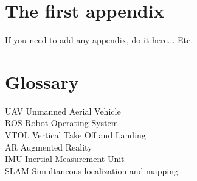 \chapter{The first appendix}
If you need to add any appendix, do it here...
 Etc.
\chapter{Glossary}
UAV Unmanned Aerial Vehicle\\
ROS Robot Operating System \\
VTOL Vertical Take Off and Landing \\
AR Augmented Reality \\
IMU Inertial Measurement Unit\\
SLAM Simultaneous localization and mapping\\

\iffalse
AUV Autonomous Unmanned Vehicle \\
BSD Berkeley Software Distribution \\ 
∆ Amount of Increase \\
ESC Electronic Speed Controller\\
GPS Global Positioning System\\
κp Proportional Constant used in control\\
κi Integrative Constant used in control\\
κd Derivative Constant used in control\\
\Omega Angular Speed\\
\Phi Angular Speed in ¨ X direction\\
\psi Angular Speed in ¨ Z direction\\
PID Proportional-Integral-Derivative controller\\

UWV Unmanned Water Vehicle\\
\theta Angular Speed in ¨ Y direction\\

\fi